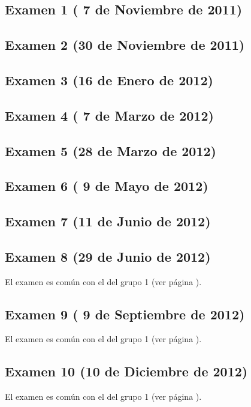 \documentclass[a4paper,12pt,twoside]{book}
\begin{document}
\subsection{Examen 1 ( 7 de Noviembre de 2011)}
\subsection{Examen 2 (30 de Noviembre de 2011)}
\subsection{Examen 3 (16 de Enero de 2012)}
\subsection{Examen 4 ( 7 de Marzo de 2012)}
\subsection{Examen 5 (28 de Marzo de 2012)}
\subsection{Examen 6 ( 9 de Mayo de 2012)}
\subsection{Examen 7 (11 de Junio de 2012)}
\subsection{Examen 8 (29 de Junio de 2012)}
El examen es común con el del grupo 1 (ver página \pageref{examen_11_12_1_8}).
\subsection{Examen 9 ( 9 de Septiembre de 2012)}
El examen es común con el del grupo 1 (ver página \pageref{examen_11_12_1_9}).
\subsection{Examen 10 (10 de Diciembre de 2012)}
El examen es común con el del grupo 1 (ver página \pageref{examen_11_12_1_10}).
\end{document}
